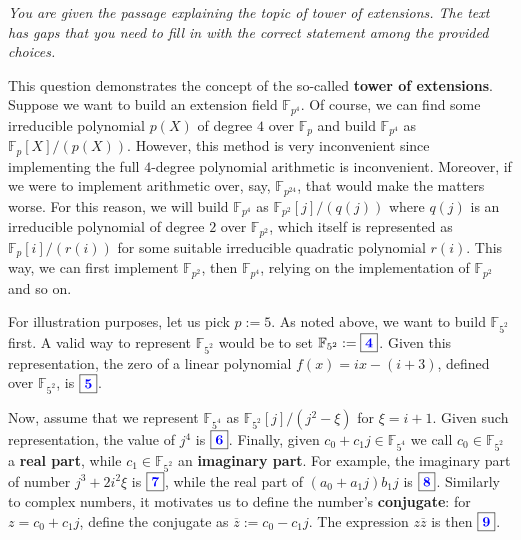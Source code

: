 \documentclass[../lecture-notes.tex]{subfiles}
\begin{document}
\begin{tcolorbox}[breakable, colback=blue!5!white,fonttitle=\bfseries,colframe=blue!80!white,title=Exercises 4-9. Tower of Extensions]
    \textit{You are given the passage explaining the topic of tower of extensions. The text has gaps that you need to fill in with the correct statement among the provided choices.}
    
    This question demonstrates the concept of the so-called \textbf{tower of extensions}. Suppose we want to build an extension field $\mathbb{F}_{p^4}$. Of course, we can find some irreducible polynomial $p(X)$ of degree $4$ over $\mathbb{F}_p$ and build $\mathbb{F}_{p^4}$ as $\mathbb{F}_p[X]/(p(X))$. However, this method is very inconvenient since implementing the full $4$-degree polynomial arithmetic is inconvenient. Moreover, if we were to implement arithmetic over, say, $\mathbb{F}_{p^{24}}$, that would make the matters worse. For this reason, we will build $\mathbb{F}_{p^4}$ as $\mathbb{F}_{p^2}[j]/(q(j))$ where $q(j)$ is an irreducible polynomial of degree $2$ over $\mathbb{F}_{p^2}$, which itself is represented as $\mathbb{F}_p[i]/(r(i))$ for some suitable irreducible quadratic polynomial $r(i)$. This way, we can first implement $\mathbb{F}_{p^2}$, then $\mathbb{F}_{p^4}$, relying on the implementation of $\mathbb{F}_{p^2}$ and so on.

    For illustration purposes, let us pick $p:=5$. As noted above, we want to build $\mathbb{F}_{5^2}$ first. A valid way to represent $\mathbb{F}_{5^2}$ would be to set $\mathbb{F}_{5^2} := \boxed{\textcolor{blue}{\textbf{4}}}$. Given this representation, the zero of a linear polynomial $f(x) = ix - (i+3)$, defined over $\mathbb{F}_{5^2}$, is $\boxed{\textcolor{blue}{\textbf{5}}}$.

    Now, assume that we represent $\mathbb{F}_{5^4}$ as $\mathbb{F}_{5^2}[j]/(j^2-\xi)$ for $\xi = i+1$. Given such representation, the value of $j^4$ is $\boxed{\textcolor{blue}{\textbf{6}}}$. Finally, given $c_0+c_1j \in \mathbb{F}_{5^4}$ we call $c_0 \in \mathbb{F}_{5^2}$ a \textbf{real part}, while $c_1 \in \mathbb{F}_{5^2}$ an \textbf{imaginary part}. For example, the imaginary part of number $j^3+2i^2\xi$ is $\boxed{\textcolor{blue}{\textbf{7}}}$, while the real part of $(a_0+a_1j)b_1j$ is $\boxed{\textcolor{blue}{\textbf{8}}}$. Similarly to complex numbers, it motivates us to define the number's \textbf{conjugate}: for $z = c_0+c_1j$, define the conjugate as $\overline{z} := c_0-c_1j$. The expression $z\overline{z}$ is then $\boxed{\textcolor{blue}{\textbf{9}}}$.
\end{tcolorbox}
\end{document}
